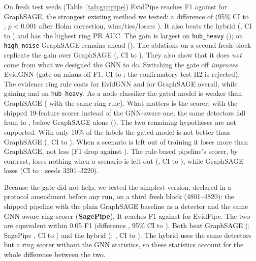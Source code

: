 On fresh test seeds (Table~\ref{tab:gnnpipe}) EvidPipe reaches F1
\EgMainevidpipeF{} against \EgMaingnnunscoredF{} for GraphSAGE, the strongest
existing method we tested: a difference of \EgHoneD{} (95\% CI \EgHoneLo{} to \EgHoneHi{},
$p<0.001$ after Holm correction, wins/ties/losses \EgHoneWtl{}). It also beats the hybrid
(\EgVsHybridD{}, CI \EgVsHybridLo{} to \EgVsHybridHi{}) and has the highest ring
PR AUC. The gain is largest on \texttt{hub\_heavy} (\EgHoneHub{}); on
\texttt{high\_noise} GraphSAGE remains ahead (\EgHoneNoise{}). The ablations on a
second fresh block replicate the gain over GraphSAGE (\EgAbRepD{}, CI
\EgAbRepLo{} to \EgAbRepHi{}). They also show that it does \emph{not} come from what we designed
the GNN to do. Switching the gate off \emph{improves} EvidGNN (gate on minus off
\EgAbGateD{} F1, CI \EgAbGateLo{} to \EgAbGateHi{}; the confirmatory test H2 is
rejected). The evidence ring rule
costs \EgAbRuleEvD{} for EvidGNN and \EgAbRuleSageD{} for GraphSAGE overall, while
gaining \EgAbRuleEvHub{} and \EgAbRuleSageHub{} on \texttt{hub\_heavy}. As a node classifier the gated
model is weaker than GraphSAGE (\EgAbModelD{} with the same ring rule). What
matters is the scorer: with the shipped 19-feature scorer instead of the
GNN-aware one, the same detectors fall from \EgAbFevidpipe{} to
\EgAbFevidpipeshippedscorer{}, below GraphSAGE alone (\EgAbFgnnunscored{}). The
two remaining hypotheses are not supported. With only 10\% of the labels the
gated model is not better than GraphSAGE (\EgHfourD{}, CI \EgHfourLo{} to
\EgHfourHi{}). When a scenario is left out of training it loses more than
GraphSAGE, not less (F1 drop \EgLosoEvidDrop{} against \EgLosoSageDrop{}). The
rule-based pipeline's scorer, by contrast, loses nothing when a scenario is left
out (\RtLosoPipeDrop{}, CI \RtLosoPipeLo{} to \RtLosoPipeHi{}), while GraphSAGE loses
\RtLosoSageDrop{} (CI \RtLosoSageLo{} to \RtLosoSageHi{}; seeds 3201--3220).

Because the gate did not help, we tested the simplest version, declared in a
protocol amendment before any run, on a third fresh block (4801--4820): the
shipped pipeline with the plain GraphSAGE baseline as a detector and the same
GNN-aware ring scorer (\textbf{SagePipe}). It reaches F1 \EgFoFsagepipe{} against
\EgFoFevidpipe{} for EvidPipe. The two are equivalent within 0.05 F1 (difference
\EgFoSageVsEvidD{}, 95\% CI \EgFoSageVsEvidLo{} to \EgFoSageVsEvidHi{}). Both beat
GraphSAGE (\EgFoFgnnunscored{}; SagePipe \EgFoSageVsGnnD{}, CI \EgFoSageVsGnnLo{} to
\EgFoSageVsGnnHi{}) and the hybrid (\EgFoFhybrid{}; \EgFoSageVsHybridD{}, CI
\EgFoSageVsHybridLo{} to \EgFoSageVsHybridHi{}). The hybrid uses the same detectors
but a ring scorer without the GNN statistics, so these statistics account for
the whole difference between the two.

